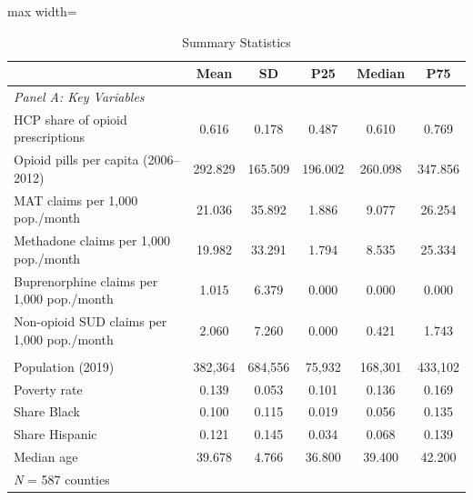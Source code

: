\begin{table}[t]
\centering
\caption{Summary Statistics}
\label{tab:sumstats}
\small
\begin{adjustbox}{max width=\textwidth}
\begin{tabular}{lccccc}
\hline\hline
  & Mean & SD & P25 & Median & P75 \\
\hline
\multicolumn{6}{l}{\textit{Panel A: Key Variables}} \\[3pt]
  HCP share of opioid prescriptions & 0.616 & 0.178 & 0.487 & 0.610 & 0.769 \\
  Opioid pills per capita (2006--2012) & 292.829 & 165.509 & 196.002 & 260.098 & 347.856 \\
  MAT claims per 1,000 pop./month & 21.036 & 35.892 & 1.886 & 9.077 & 26.254 \\
  Methadone claims per 1,000 pop./month & 19.982 & 33.291 & 1.794 & 8.535 & 25.334 \\
  Buprenorphine claims per 1,000 pop./month & 1.015 & 6.379 & 0.000 & 0.000 & 0.000 \\
  Non-opioid SUD claims per 1,000 pop./month & 2.060 & 7.260 & 0.000 & 0.421 & 1.743 \\
\addlinespace[6pt]
\multicolumn{6}{l}{\textit{Panel B: County Controls}} \\[3pt]
  Population (2019) & 382,364 & 684,556 & 75,932 & 168,301 & 433,102 \\
  Poverty rate & 0.139 & 0.053 & 0.101 & 0.136 & 0.169 \\
  Share Black & 0.100 & 0.115 & 0.019 & 0.056 & 0.135 \\
  Share Hispanic & 0.121 & 0.145 & 0.034 & 0.068 & 0.139 \\
  Median age & 39.678 & 4.766 & 36.800 & 39.400 & 42.200 \\
\hline
\multicolumn{6}{l}{\textit{N} = 587 counties} \\
\end{tabular}
\end{adjustbox}
\par{}
\end{table}
